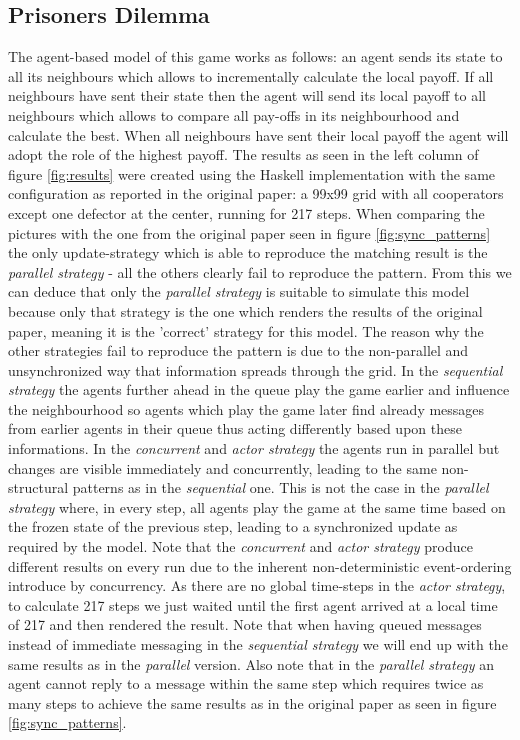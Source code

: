 
\subsection{Prisoners Dilemma}
The agent-based model of this game works as follows: an agent sends its state to all its neighbours which allows to incrementally calculate the local payoff. If all neighbours have sent their state then the agent will send its local payoff to all neighbours which allows to compare all pay-offs in its neighbourhood and calculate the best. When all neighbours have sent their local payoff the agent will adopt the role of the highest payoff.
The results as seen in the left column of figure \ref{fig:results} were created using the Haskell implementation with the same configuration as reported in the original paper: a 99x99 grid with all cooperators except one defector at the center, running for 217 steps. When comparing the pictures with the one from the original paper seen in figure \ref{fig:sync_patterns} the only update-strategy which is able to reproduce the matching result is the \textit{parallel strategy} - all the others clearly fail to reproduce the pattern. From this we can deduce that only the \textit{parallel strategy} is suitable to simulate this model because only that strategy is the one which renders the results of the original paper, meaning it is the 'correct' strategy for this model. The reason why the other strategies fail to reproduce the pattern is due to the non-parallel and unsynchronized way that information spreads through the grid. In the \textit{sequential strategy} the agents further ahead in the queue play the game earlier and influence the neighbourhood so agents which play the game later find already messages from earlier agents in their queue thus acting differently based upon these informations. In the \textit{concurrent} and \textit{actor strategy} the agents run in parallel but changes are visible immediately and concurrently, leading to the same non-structural patterns as in the \textit{sequential} one. This is not the case in the \textit{parallel strategy}  where, in every step, all agents play the game at the same time based on the frozen state of the previous step, leading to a synchronized update as required by the model. Note that the \textit{concurrent} and \textit{actor strategy} produce different results on every run due to the inherent non-deterministic event-ordering introduce by concurrency. As there are no global time-steps in the \textit{actor strategy}, to calculate 217 steps we just waited until the first agent arrived at a local time of 217 and then rendered the result.
Note that when having queued messages instead of immediate messaging in the \textit{sequential strategy} we will end up with the same results as in the \textit{parallel} version. Also note that in the \textit{parallel strategy} an agent cannot reply to a message within the same step which requires twice as many steps to achieve the same results as in the original paper as seen in figure \ref{fig:sync_patterns}.

